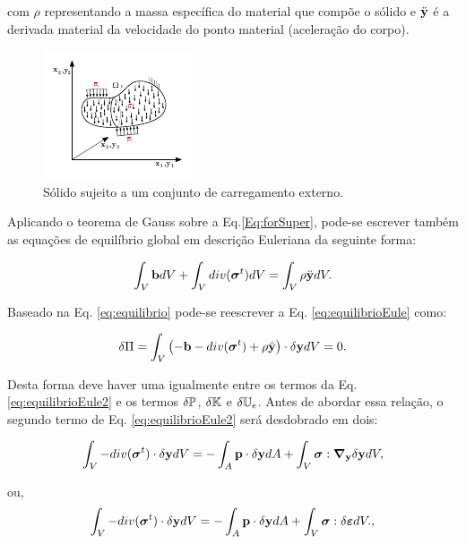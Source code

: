 \documentclass[tese_patricia]{subfiles}
\begin{document}
\noindent com $\rho$ representando a massa específica do material que compõe o sólido e $\ddot{\mathbf{y}}$ é a derivada material da velocidade do ponto material (aceleração do corpo).

\begin{figure}[htb!]
	\centering
	\includegraphics[scale=4,trim=0cm 0.2cm 0cm 0cm, clip=true]{Imagens/Cap4/eqSol3.pdf}	
	\caption{Sólido sujeito a um conjunto de carregamento externo.}
	\label{fig:EquiSol}
\end{figure}
 
 Aplicando o teorema de Gauss sobre a Eq.\eqref{Eq:forSuper}, pode-se escrever também as equações de equilíbrio global em descrição Euleriana da seguinte forma:

\begin{align}
\int_{V} \mathbf{b} dV + \int_{V} div({\boldsymbol{\sigma}}^{t}) dV = \int_{V} \rho  \ddot{\mathbf{y}} dV. \label{eq:equilibrioEule}
\end{align}

Baseado na Eq. \eqref{eq:equilibrio} pode-se reescrever a Eq. \eqref{eq:equilibrioEule} como:

\begin{align}
\delta\Pi = \int_{V} \left(- \mathbf{b} -  div({\boldsymbol{\sigma}}^{t}) + \rho \ddot{\mathbf{y}}\right) \cdot \delta\mathbf{y} dV = 0.\label{eq:equilibrioEule2}
\end{align}

Desta forma deve haver uma igualmente entre os termos da Eq. \eqref{eq:equilibrioEule2} e os termos $\delta\mathbb{P}$, $\delta\mathbb{K}$ e $\delta\mathbb{U}_e$. Antes de abordar essa relação, o segundo termo de Eq. \eqref{eq:equilibrioEule2} será desdobrado em dois:

\begin{align}
\int_{V} - div({\boldsymbol{\sigma}}^{t}) \cdot \delta\mathbf{y} dV = -\int_{A} \mathbf{p} \cdot \delta\mathbf{y} dA +  \int_{V}\boldsymbol{\sigma} : \boldsymbol{\nabla}_{\mathbf{y}} \delta\mathbf{y} dV,\label{eq:DivisaoStress}
\end{align}

\noindent ou,
\begin{align}
\int_{V} - div({\boldsymbol{\sigma}}^{t}) \cdot \delta\mathbf{y} dV = -\int_{A} \mathbf{p} \cdot \delta\mathbf{y} dA +  \int_{V}\boldsymbol{\sigma} : \delta\bm{\varepsilon} dV.\label{eq:DivisaoStress2},
\end{align}
\end{document}
